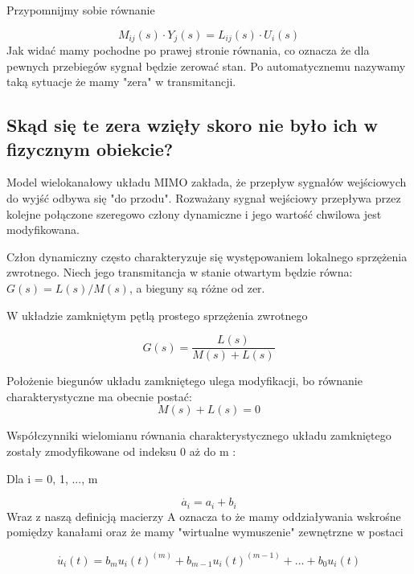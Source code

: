 \documentclass{article}
\begin{document}
	Przypomnijmy sobie równanie

	\begin{equation}
		 M_{ij}(s) \cdot Y_{j}(s) = L_{ij}(s) \cdot U_{i}(s) 
	\end{equation}
	Jak widać mamy pochodne po prawej stronie równania, co oznacza że dla pewnych
	przebiegów sygnał będzie zerować stan.
	Po automatycznemu nazywamy taką sytuacje że mamy "zera" w transmitancji.

	\subsection{Skąd się te zera wzięły skoro nie było ich w fizycznym obiekcie?}

	Model wielokanałowy układu MIMO zakłada, że przepływ sygnałów wejściowych do wyjść
	odbywa się "do przodu". Rozważany sygnał wejściowy przepływa przez
	kolejne połączone szeregowo człony dynamiczne i jego wartość chwilowa jest
	modyfikowana.

	Człon dynamiczny często charakteryzuje się występowaniem lokalnego
	sprzężenia zwrotnego. Niech jego transmitancja w stanie otwartym będzie równa:
	$G(s) = L(s)/M(s)$, a bieguny są różne od zer.

	W układzie zamkniętym pętlą prostego sprzężenia zwrotnego

	\begin{equation}
		G(s) = \frac{L(s)}{M(s) + L(s)}
	\end{equation}

	Położenie biegunów układu zamkniętego ulega modyfikacji, bo równanie charakterystyczne
	ma obecnie postać:
	\begin{equation}
		M(s) + L(s) = 0
	\end{equation}

	Współczynniki wielomianu równania charakterystycznego układu zamkniętego zostały
	zmodyfikowane od indeksu 0 aż do m :

	Dla i = 0, 1, ..., m

	\begin{equation}
		\dot{a_{i}} = a_{i} + b_{i}
	\end{equation}
	Wraz z naszą definicją macierzy A oznacza to że mamy oddziaływania wskrośne
	pomiędzy kanałami oraz że mamy "wirtualne wymuszenie" zewnętrzne w postaci

	\begin{equation}
		\dot{u_{i}}(t) = b_{m}u_{i}(t)^{(m)} + b_{m-1}u_{i}(t)^{(m-1)} + ... + b_{0} u_{i}(t)
	\end{equation}
\end{document}

